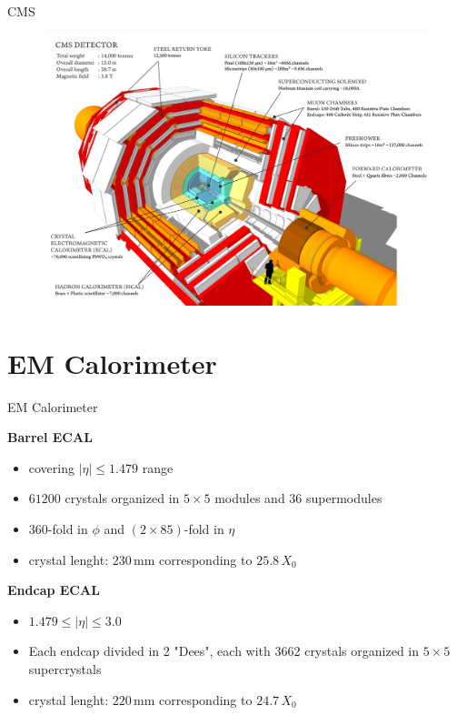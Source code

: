 \documentclass[10pt]{beamer}
\begin{document}
\begin{frame}[fragile]{CMS}
  \begin{figure}
        \centering
        \includegraphics[width=.8\textwidth]{./img/CMS_scheme.png}
    \end{figure}
\end{frame}


\section{EM Calorimeter}

\begin{frame}[fragile]{EM Calorimeter}



    \textbf{Barrel ECAL}
    \begin{itemize}
        \item  covering $|\eta| \leq 1.479 $ range
        \item $61200$ crystals organized in $5\times5$ modules and $36$ supermodules
        \item $360$-fold in $\phi$ and $(2\times85)$-fold in $\eta$
        \item crystal lenght: $230$\,mm corresponding to $25.8\,X_0$ 
    \end{itemize}
    \textbf{Endcap ECAL} 
    \begin{itemize}
        \item $1.479 \leq |\eta| \leq 3.0 $
        \item Each endcap divided in 2 "Dees", each with 3662 crystals organized in $5\times5$ supercrystals
        \item crystal lenght: $220$\,mm corresponding to $24.7\,X_0$ 
    \end{itemize}
\end{frame}
\end{document}
